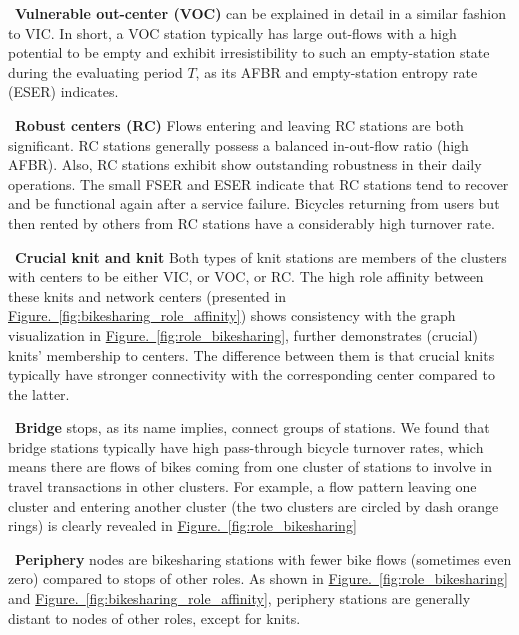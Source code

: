 \documentclass[a4paper,fleqn]{cas-sc}
\begin{document}
\noindent \textbullet \, \textbf{Vulnerable out-center (VOC)} can be explained in detail in a similar fashion to VIC. In short, a VOC station typically has large out-flows with a high potential to be empty and exhibit irresistibility to such an empty-station state during the evaluating period $T$, as its AFBR and empty-station entropy rate (ESER) indicates.\newline

\noindent \textbullet \, \textbf{Robust centers (RC)} Flows entering and leaving RC stations are both significant. RC stations generally possess a balanced in-out-flow ratio (high AFBR). Also, RC stations exhibit show outstanding robustness in their daily operations. The small FSER and ESER indicate that RC stations tend to recover and be functional again after a service failure. Bicycles returning from users but then rented by others from RC stations have a considerably high turnover rate.\newline

\noindent \textbullet \, \textbf{Crucial knit and knit} Both types of knit stations are members of the clusters with centers to be either VIC, or VOC, or RC. The high role affinity between these knits and network centers (presented in \hyperref[fig:bikesharing_role_affinity]{Figure.~\ref{fig:bikesharing_role_affinity}}) shows consistency with the graph visualization in \hyperref[fig:role_bikesharing]{Figure.~\ref{fig:role_bikesharing}}, further demonstrates (crucial) knits' membership to centers. The difference between them is that crucial knits typically have stronger connectivity with the corresponding center compared to the latter.\newline

\noindent \textbullet \, \textbf{Bridge} stops, as its name implies, connect groups of stations. We found that bridge stations typically have high pass-through bicycle turnover rates, which means there are flows of bikes coming from one cluster of stations to involve in travel transactions in other clusters. For example, a flow pattern leaving one cluster and entering another cluster (the two clusters are circled by dash orange rings) is clearly revealed in \hyperref[fig:role_bikesharing]{Figure.~\ref{fig:role_bikesharing}}\newline

\noindent \textbullet \, \textbf{Periphery} nodes are bikesharing stations with fewer bike flows (sometimes even zero) compared to stops of other roles. As shown in \hyperref[fig:role_bikesharing]{Figure.~\ref{fig:role_bikesharing}} and \hyperref[fig:bikesharing_role_affinity]{Figure.~\ref{fig:bikesharing_role_affinity}}, periphery stations are generally distant to nodes of other roles, except for knits.\newline
\end{document}
